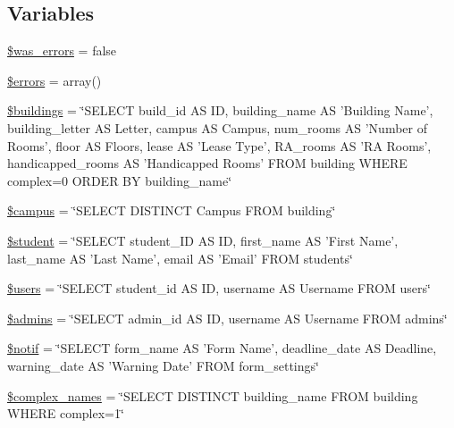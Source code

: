 \subsection*{\-Variables}
\begin{DoxyCompactItemize}
\item 
\hyperlink{settings_8php_ae8f928f475945454d3cfd1d4214c09f2}{\$was\-\_\-errors} = false
\item 
\hyperlink{settings_8php_ab24faf4aa647cdcee494fc48524ad4ff}{\$errors} = array()
\item 
\hyperlink{settings_8php_a430365aa824380ed32157dab98577b5b}{\$buildings} = \char`\"{}\-S\-E\-L\-E\-C\-T build\-\_\-id \-A\-S \-I\-D, building\-\_\-name \-A\-S '\-Building \-Name', building\-\_\-letter \-A\-S \-Letter, campus \-A\-S \-Campus, num\-\_\-rooms \-A\-S '\-Number of \-Rooms', floor \-A\-S \-Floors, lease \-A\-S '\-Lease \-Type', \-R\-A\-\_\-rooms \-A\-S '\-R\-A \-Rooms', handicapped\-\_\-rooms \-A\-S '\-Handicapped \-Rooms' \-F\-R\-O\-M building \-W\-H\-E\-R\-E complex=0 \-O\-R\-D\-E\-R \-B\-Y building\-\_\-name\char`\"{}
\item 
\hyperlink{settings_8php_a6f0655994f3941d6ab50f681032f899b}{\$campus} = \char`\"{}\-S\-E\-L\-E\-C\-T \-D\-I\-S\-T\-I\-N\-C\-T \-Campus \-F\-R\-O\-M building\char`\"{}
\item 
\hyperlink{settings_8php_a5a5a2522ab0ea5c503744aa937fac0e2}{\$student} = \char`\"{}\-S\-E\-L\-E\-C\-T student\-\_\-\-I\-D \-A\-S \-I\-D, first\-\_\-name \-A\-S '\-First \-Name', last\-\_\-name \-A\-S '\-Last \-Name', email \-A\-S '\-Email' \-F\-R\-O\-M students\char`\"{}
\item 
\hyperlink{settings_8php_a28005d22fa7ef2dfe215ad886b497d9c}{\$users} = \char`\"{}\-S\-E\-L\-E\-C\-T student\-\_\-id \-A\-S \-I\-D, username \-A\-S \-Username \-F\-R\-O\-M users\char`\"{}
\item 
\hyperlink{settings_8php_ae508e19115d8c43284ba5177298a107b}{\$admins} = \char`\"{}\-S\-E\-L\-E\-C\-T admin\-\_\-id \-A\-S \-I\-D, username \-A\-S \-Username \-F\-R\-O\-M admins\char`\"{}
\item 
\hyperlink{settings_8php_a088b05600068f1f98fec9e435a59fa4a}{\$notif} = \char`\"{}\-S\-E\-L\-E\-C\-T form\-\_\-name \-A\-S '\-Form \-Name', deadline\-\_\-date \-A\-S \-Deadline, warning\-\_\-date \-A\-S '\-Warning \-Date' \-F\-R\-O\-M form\-\_\-settings\char`\"{}
\item 
\hyperlink{settings_8php_a35bd04dbb758885cf1cdf47f4d9d338d}{\$complex\-\_\-names} = \char`\"{}\-S\-E\-L\-E\-C\-T \-D\-I\-S\-T\-I\-N\-C\-T building\-\_\-name \-F\-R\-O\-M building \-W\-H\-E\-R\-E complex=1\char`\"{}

\end{DoxyCompactItemize}
